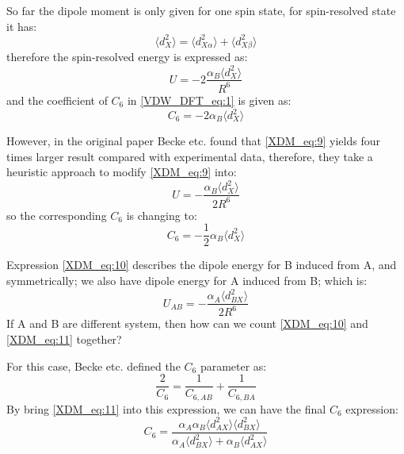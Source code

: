 So far the dipole moment is only given for one spin state, for spin-resolved state
it has:
\begin{equation}
 \label{XDM_eq:8}
\langle d_{X}^{2} \rangle = \langle d_{X\alpha}^{2}\rangle + \langle d_{X\beta}^{2}\rangle
\end{equation}
therefore the spin-resolved energy is expressed as:
\begin{equation}
 \label{XDM_eq:9}
U = -2\frac{\alpha_{B}\langle d_{X}^{2}\rangle}{R^{6}}
\end{equation}
and the coefficient of $C_{6}$ in \ref{VDW_DFT_eq:1} is given as:
\begin{equation}
 C_{6} = -2\alpha_{B}\langle d_{X}^{2}\rangle
\end{equation}

However, in the original paper Becke etc. found that \ref{XDM_eq:9} yields four times larger result 
compared with experimental data, therefore, they take a heuristic approach to modify \ref{XDM_eq:9}
into:
\begin{equation}
 \label{XDM_eq:10}
U = -\frac{\alpha_{B}\langle d_{X}^{2}\rangle}{2R^{6}}
\end{equation}
so the corresponding $C_{6}$ is changing to:
\begin{equation}
\label{XDM_eq:12}
 C_{6} = -\frac{1}{2}\alpha_{B}\langle d_{X}^{2}\rangle
\end{equation}


Expression \ref{XDM_eq:10} describes the dipole energy for B induced from A, and symmetrically;
we also have dipole energy for A induced from B; which is:
\begin{equation}
 \label{XDM_eq:11}
U_{AB} = -\frac{\alpha_{A}\langle d_{BX}^{2}\rangle}{2R^{6}}
\end{equation}
If A and B are different system, then how can we count \ref{XDM_eq:10} and \ref{XDM_eq:11} 
together?

For this case, Becke etc. defined the $C_{6}$ parameter as:
\begin{equation}
 \frac{2}{C_{6}} = \frac{1}{C_{6,AB}} + \frac{1}{C_{6,BA}}
\end{equation}
By bring \ref{XDM_eq:11} into this expression, we can have the final $C_{6}$ expression:
\begin{equation}
 \label{XDM_eq:13}
C_{6} = \frac{\alpha_{A}\alpha_{B}\langle d_{AX}^{2}\rangle\langle d_{BX}^{2}\rangle}
{\alpha_{A}\langle d_{BX}^{2}\rangle + \alpha_{B}\langle d_{AX}^{2}\rangle}
\end{equation}



 



